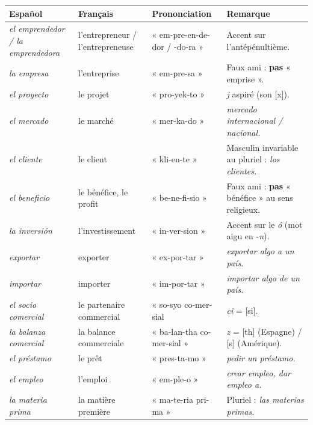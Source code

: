 \documentclass[11pt]{article}
\newcommand{\esp}[1]{\ifmmode\text{\textit{#1}}\else\begingroup\selectlanguage{spanish}\itshape #1\endgroup\fi}
\begin{document}
\begin{definition}
\begin{center}
\begin{tabularx}{\linewidth}{|X|X|X|X|}
\hline
\rowcolor{popblueL}
\textbf{Español} & \textbf{Français} & \textbf{Prononciation} & \textbf{Remarque} \\
\hline
\esp{el emprendedor / la emprendedora} & l'entrepreneur / l'entrepreneuse & « em-pre-en-de-dor / -do-ra » & Accent sur l'antépénultième. \\
\hline
\esp{la empresa} & l'entreprise & « em-pre-sa » & Faux ami : \textbf{pas} « emprise ». \\
\hline
\esp{el proyecto} & le projet & « pro-yek-to » & \emph{j} aspiré (son [x]). \\
\hline
\esp{el mercado} & le marché & « mer-ka-do » & \esp{mercado internacional / nacional}. \\
\hline
\esp{el cliente} & le client & « kli-en-te » & Masculin invariable au pluriel : \esp{los clientes}. \\
\hline
\esp{el beneficio} & le bénéfice, le profit & « be-ne-fi-sio » & Faux ami : \textbf{pas} « bénéfice » au sens religieux. \\
\hline
\esp{la inversión} & l'investissement & « in-ver-sion » & Accent sur le \emph{ó} (mot aigu en -\emph{n}). \\
\hline
\esp{exportar} & exporter & « ex-por-tar » & \esp{exportar algo a un país}. \\
\hline
\esp{importar} & importer & « im-por-tar » & \esp{importar algo de un país}. \\
\hline
\esp{el socio comercial} & le partenaire commercial & « so-syo co-mer-sial & \emph{ci} = [si]. \\
\hline
\esp{la balanza comercial} & la balance commerciale & « ba-lan-tha co-mer-sial » & \emph{z} = [th] (Espagne) / [s] (Amérique). \\
\hline
\esp{el préstamo} & le prêt & « pres-ta-mo » & \esp{pedir un préstamo}. \\
\hline
\esp{el empleo} & l'emploi & « em-ple-o » & \esp{crear empleo, dar empleo a}. \\
\hline
\esp{la materia prima} & la matière première & « ma-te-ria pri-ma » & Pluriel : \esp{las materias primas}. \\
\hline
\end{tabularx}
\end{center}
\end{definition}
\end{document}
